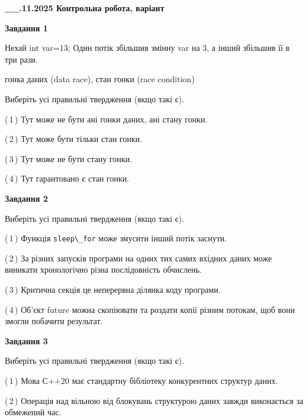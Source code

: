 \documentclass[12pt, ukrainian]{article}
\def\code#1{\Verb!#1!}
\begin{document}
\begin {large}

\textbf{\_\_.11.2025 Контрольна робота, варіант  }\par


{

\begin{center}
\textbf{Завдання 1}
\end{center}
Нехай int var=13; Один потік збільшив змінну var на 3, а інший збільшив її в три рази.

гонка даних (data race), стан гонки (race condition)

Виберіть усі правильні твердження (якщо такі є).\par
\vspace{2mm}
(\,1\,) Тут може не бути ані гонки даних, ані стану гонки.%

(\,2\,) Тут може бути тільки стан гонки.%

(\,3\,) Тут може не бути стану гонки.%

(\,4\,) Тут гарантовано є стан гонки.%



\begin{center}
\textbf{Завдання 2}
\end{center}
Виберіть усі правильні твердження (якщо такі є).\par
\vspace{2mm}

(\,1\,) Функція \code{sleep\_for} може змусити інший потік заснути.%

(\,2\,) За різних запусків програми на одних тих самих вхідних даних може виникати хронологічно різна послідовність обчислень.%

(\,3\,) Критична секція це неперервна ділянка коду програми.%

(\,4\,) Об’єкт future можна скопіювати та роздати копії різним потокам, щоб вони змогли побачити результат.%



\begin{center}
\textbf{Завдання 3}
\end{center}
Виберіть усі правильні твердження (якщо такі є).\par
\vspace{2mm}

(\,1\,) Мова С++20 має стандартну бібліотеку конкурентних структур даних.%

(\,2\,) Операція над вільною від блокувань структурою даних завжди виконається за обмежений час.%

}
\end{large}
\end{document}
